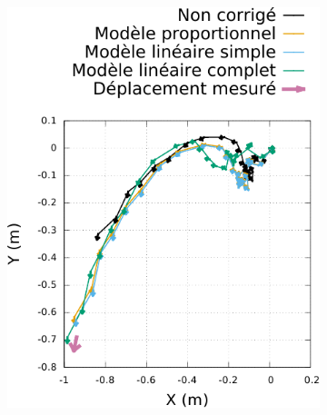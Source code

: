 \begin{figure}[h]
    \centerfloat
    \begin{subfigure}{0.28\paperwidth}
        \centering
        \includegraphics[type=pdf,ext=.pdf,read=.pdf,width=1.0\linewidth]{../plot/OdometryCMAES/readsTraj1}
    \end{subfigure}
    \begin{subfigure}{0.28\paperwidth}
        \centering

\end{subfigure}
\end{figure}
